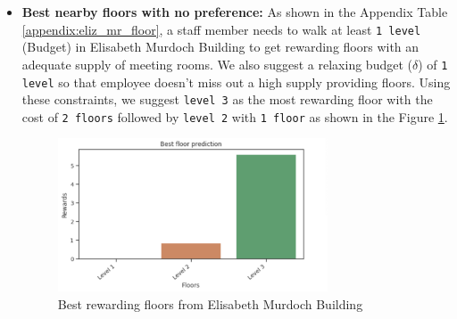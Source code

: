 \begin{itemize}
    \item \textbf{Best nearby floors with no preference:} As shown in the Appendix Table \ref{appendix:eliz_mr_floor}, a staff member needs to walk at least \texttt{1 level} (Budget) in Elisabeth Murdoch Building to get rewarding floors with an adequate supply of meeting rooms. We also suggest a relaxing budget ($\delta$) of \texttt{1 level} so that employee doesn't miss out a high supply providing floors. Using these constraints, we suggest \texttt{level 3} as the most rewarding floor with the cost of \texttt{2 floors} followed by \texttt{level 2} with \texttt{1 floor} as shown in the Figure \ref{fig:eliz-floor-no-factors}.

\begin{figure}[H]
\centering
  \includegraphics[width=8cm]{content/results/floors/plots/eliz-floor-no-factors.png}
\caption{Best rewarding floors from Elisabeth Murdoch Building}
\label{fig:eliz-floor-no-factors}
\end{figure}




\end{itemize}
